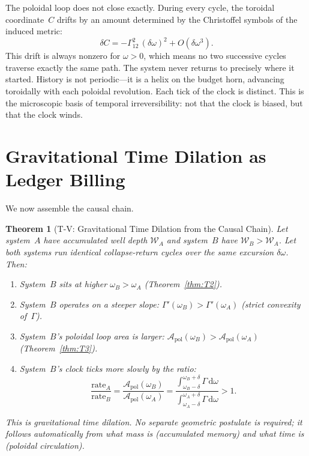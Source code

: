\documentclass[
  aps,
  prd,
  twocolumn,
  superscriptaddress,
  nofootinbib,
  floatfix
]{revtex4-2}
\newtheorem{theorem}{Theorem}
\newcommand{\Gam}{\Gamma}
\newcommand{\dd}{\mathrm{d}}
\newcommand{\Apol}{\mathcal{A}_{\mathrm{pol}}}         %
\newcommand{\memwell}{\mathcal{W}}                     %
\begin{document}
The poloidal loop does not close exactly.  During every
cycle, the toroidal coordinate~$C$ drifts by an amount
determined by the Christoffel symbols of the induced metric:
\begin{equation}
  \delta C = -\Gam^2_{12}\,(\delta\omega)^2 + O(\delta\omega^3).
\end{equation}
This drift is always nonzero for $\omega > 0$, which means
no two successive cycles traverse exactly the same path.
The system never returns to precisely where it started.
History is not periodic---it is a helix on the budget horn,
advancing toroidally with each poloidal revolution.
Each tick of the clock is distinct.  This is the
microscopic basis of temporal irreversibility: not that
the clock is biased, but that the clock winds.

\section{Gravitational Time Dilation as Ledger Billing}
\label{sec:timedilation}

We now assemble the causal chain.

\begin{theorem}[T-V: Gravitational Time Dilation from the Causal Chain]
\label{thm:T5}
Let system~$A$ have accumulated well depth $\memwell_A$ and
system~$B$ have $\memwell_B > \memwell_A$.  Let both systems
run identical collapse-return cycles over the same excursion
$\delta\omega$.  Then:
\begin{enumerate}[label=(\alph*)]
  \item System~$B$ sits at higher $\omega_B > \omega_A$
    (Theorem~\ref{thm:T2}).
  \item System~$B$ operates on a steeper slope:
    $\Gam'(\omega_B) > \Gam'(\omega_A)$ (strict convexity
    of~$\Gam$).
  \item System~$B$'s poloidal loop area is larger:
    $\Apol(\omega_B) > \Apol(\omega_A)$
    (Theorem~\ref{thm:T3}).
  \item System~$B$'s clock ticks more slowly by the ratio:
    \begin{equation}
      \frac{\text{rate}_A}{\text{rate}_B}
      = \frac{\Apol(\omega_B)}{\Apol(\omega_A)}
      = \frac{\int_{\omega_B - \delta}^{\omega_B + \delta} \Gam\,\dd\omega}
             {\int_{\omega_A - \delta}^{\omega_A + \delta} \Gam\,\dd\omega}
      > 1.
      \label{eq:ratiodilation}
    \end{equation}
\end{enumerate}
This is gravitational time dilation.  No separate geometric
postulate is required; it follows automatically from what
mass is (accumulated memory) and what time is (poloidal
circulation).
\end{theorem}
\end{document}
